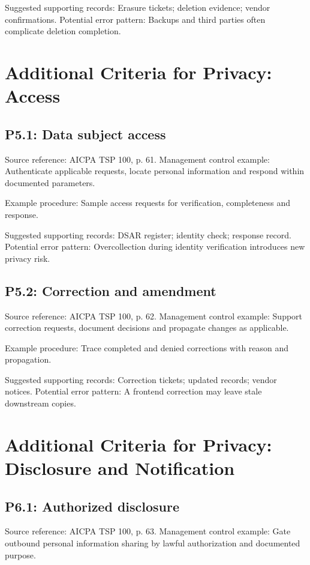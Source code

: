 \documentclass[10pt,oneside]{report}
\begin{document}
Suggested supporting records: Erasure tickets; deletion evidence; vendor confirmations. Potential error pattern: Backups and third parties often complicate deletion completion.

\section{Additional Criteria for Privacy: Access}
\subsection*{P5.1: Data subject access}
Source reference: AICPA TSP 100, p. 61. Management control example: Authenticate applicable requests, locate personal information and respond within documented parameters.

Example procedure: Sample access requests for verification, completeness and response.

Suggested supporting records: DSAR register; identity check; response record. Potential error pattern: Overcollection during identity verification introduces new privacy risk.

\subsection*{P5.2: Correction and amendment}
Source reference: AICPA TSP 100, p. 62. Management control example: Support correction requests, document decisions and propagate changes as applicable.

Example procedure: Trace completed and denied corrections with reason and propagation.

Suggested supporting records: Correction tickets; updated records; vendor notices. Potential error pattern: A frontend correction may leave stale downstream copies.

\section{Additional Criteria for Privacy: Disclosure and Notification}
\subsection*{P6.1: Authorized disclosure}
Source reference: AICPA TSP 100, p. 63. Management control example: Gate outbound personal information sharing by lawful authorization and documented purpose.
\end{document}
